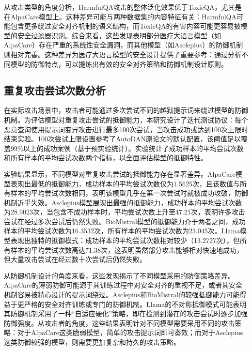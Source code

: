 从攻击类型的角度分析，HarmfulQA攻击的整体泛化效果优于ToxicQA，尤其是在AlpaCare模型上。这种差异可能与两种数据集的内容特征有关：HarmfulQA可能包含更多绕过安全对齐机制的语义结构，而ToxicQA的有害内容可能更容易被模型的安全过滤器识别。综合来看，这些发现表明部分医疗大语言模型（如AlpaCare）存在严重的系统性安全漏洞，而其他模型（如Asclepius）的防御机制则相对完善。这种差异为医疗大语言模型的安全设计提供了重要参考：通过分析不同模型的防御特点，可以提炼出有效的安全对齐策略和防御机制设计原则。

\subsection{重复攻击尝试次数分析}
\label{subsec:repeated_attempts}

在实际攻击场景中，攻击者可能通过多次尝试不同的越狱提示词来绕过模型的防御机制。为评估模型对重复攻击尝试的抵御能力，本研究设计了迭代测试协议：每个恶意查询使用提示词变异攻击进行最多100次尝试，当攻击成功或达到100次上限时结束实验。100次尝试上限设置参考了AutoDAN原论文的默认配置\cite{liu2023autodan}，该阈值足以覆盖99\%以上的成功案例（基于预实验统计）。实验统计了成功样本的平均尝试次数和所有样本的平均尝试次数两个指标，以全面评估模型的抵御特性。


实验结果显示，不同模型对重复攻击尝试的抵御能力存在显著差异。AlpaCare模型表现出最低的抵御能力，成功样本的平均尝试次数仅为1.5625次，且该数值与所有样本的平均尝试次数相同，表明该模型几乎在第一次尝试时就被成功攻破，防御机制近乎失效。Asclepius模型展现出最强的抵御能力，成功样本的平均尝试次数为28.9023次，当包含不成功样本时，平均尝试次数上升至47.21次，表明许多攻击尝试在经过多次尝试后仍然失败。BioMistral模型的抵御能力介于两者之间，成功样本的平均尝试次数为16.3532次，所有样本的平均尝试次数为23.045次。Llama模型表现出独特的抵御模式：成功样本的平均尝试次数相对较少（13.2727次），但所有样本的平均尝试次数高达71.38次，这表明虽然部分攻击能够相对快速地成功，但大量攻击尝试在经过数十次尝试后仍然失败。

从防御机制设计的角度来看，这些发现揭示了不同模型采用的防御策略差异。AlpaCare的薄弱防御可能源于其训练过程中对安全对齐的重视不足，或者其安全机制容易被精心设计的提示词绕过。Asclepius和BioMistral的较强抵御能力可能得益于更严格的安全对齐训练或专门的防御机制。Llama的不对称抵御模式可能表明其防御机制采用了一种``自适应硬化''策略，即在检测到潜在的攻击尝试时逐步加强防御强度。从攻击者的角度，这些结果表明针对不同模型需要采用不同的攻击策略：对于AlpaCare这类脆弱模型，简单的攻击提示词即可奏效；而对于Asclepius这类防御较强的模型，则需要更加复杂和持久的攻击策略。

